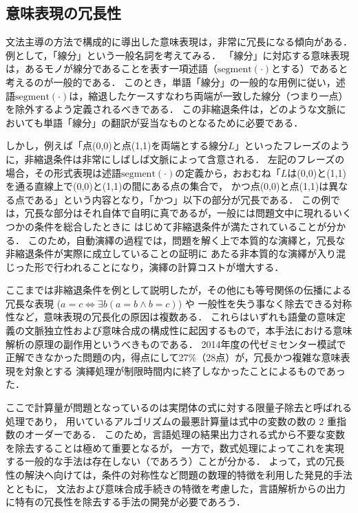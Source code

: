 \documentclass[japanese]{jnlp_1.4b}
\begin{document}
\subsection{意味表現の冗長性}

文法主導の方法で構成的に導出した意味表現は，非常に冗長になる傾向がある．
例として，「線分」という一般名詞を考えてみる．
「線分」に対応する意味表現は，あるモノが線分であることを表す一項述語（$\text{segment}(\cdot)$とする）であると考えるのが一般的である．
このとき，単語「線分」の一般的な用例に従い，述語$\text{segment}(\cdot)$は，縮退したケースすなわち両端が一致した線分（つまり一点）を除外するよう定義されるべきである．
この非縮退条件は，どのような文脈においても単語「線分」の翻訳が妥当なものとなるために必要である．

しかし，例えば「点(0,0)と点(1,1)を両端とする線分$L$」といったフレーズのように，非縮退条件は非常にしばしば文脈によって含意される．
左記のフレーズの場合，その形式表現は述語$\text{segment}(\cdot)$の定義から，おおむね「$L$は(0,0)と(1,1)を通る直線上で(0,0)と(1,1)の間にある点の集合で，
かつ点(0,0)と点(1,1)は異なる点である」という内容となり，「かつ」以下の部分が冗長である．
この例では，冗長な部分はそれ自体で自明に真であるが，一般には問題文中に現れるいくつかの条件を総合したときに
はじめて非縮退条件が満たされていることが分かる．
このため，自動演繹の過程では，問題を解く上で本質的な演繹と，冗長な非縮退条件が実際に成立していることの証明に
あたる非本質的な演繹が入り混じった形で行われることになり，演繹の計算コストが増大する．

ここまでは非縮退条件を例として説明したが，その他にも等号関係の伝播による冗長な表現 ($a=c \Leftrightarrow \exists b(a=b \wedge b=c)$) や
一般性を失う事なく除去できる対称性など，意味表現の冗長化の原因は複数ある．
これらはいずれも語彙の意味定義の文脈独立性および意味合成の構成性に起因するもので，本手法における意味解析の原理の副作用というべきものである．
2014年度の代ゼミセンター模試で正解できなかった問題の内，得点にして27\%（28点）が，冗長かつ複雑な意味表現を対象とする
演繹処理が制限時間内に終了しなかったことによるものであった．

ここで計算量が問題となっているのは実閉体の式に対する限量子除去と呼ばれる処理\cite{qebook-e,IwaneYAY13}であり，
用いているアルゴリズムの最悪計算量は式中の変数の数の 2 重指数のオーダーである．
このため，言語処理の結果出力される式から不要な変数を除去することは極めて重要となるが，
一方で，数式処理によってこれを実現する一般的な手法は存在しない（であろう）ことが分かる．
よって，式の冗長性の解決へ向けては，条件の対称性など問題の数理的特徴を利用した発見的手法とともに，
文法および意味合成手続きの特徴を考慮した，言語解析からの出力に特有の冗長性を除去する手法の開発が必要であろう．
\end{document}
